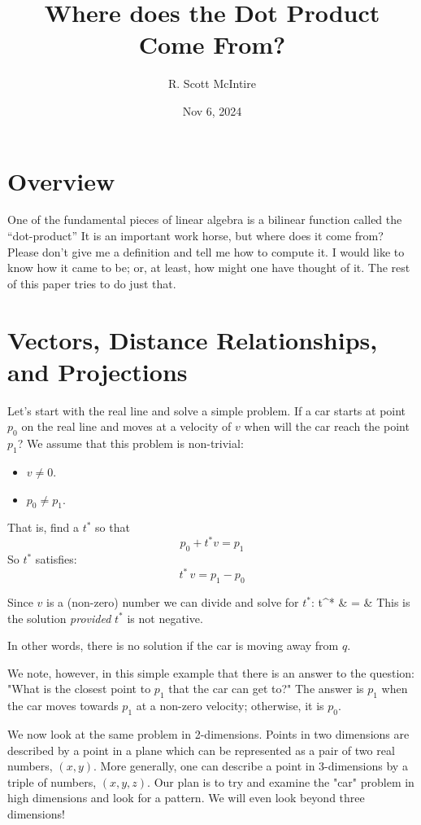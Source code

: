 \documentclass[12pt]{article}
\title{Where does the Dot Product Come From?}
\author{R. Scott McIntire}
\date{Nov 6, 2024}
\begin{document}
\maketitle

\section{Overview}
One of the fundamental pieces of linear algebra is a bilinear function
called the ``dot-product'' It is an important work horse, but where does
it come from? Please don't give me a definition and tell me how to compute it.
I would like to know how it came to be; or, at least, how might one
have thought of it. The rest of this paper tries to do just that.

\section{ Vectors, Distance Relationships, and Projections}
Let's start with the real line and solve a simple problem. 
If a car starts at 
point $p_0$ on the real line and moves at a velocity of $v$ when will the car 
reach the point $p_1$? We assume that this problem is non-trivial:
\begin{itemize}
	\item{$v \ne 0$.}
	\item{$p_0 \ne p_1$.}
\end{itemize}

That is, find a $t^*$ so that
$$ p_0 + t^* v = p_1$$
So $t^*$ satisfies:
$$ t^* \, v = p_1 - p_0$$

Since $v$ is a (non-zero) number we can divide and solve for 
$t^*$:%
\be
	t^* & = &  \label{closest_1}
\ee
This is the solution {\em provided\/} 
$t^*$ is not negative.

In other words, there is no solution if the car is 
moving away from $q$.

We note, however, in this simple example that there is an answer to the question:
"What is the closest point to $p_1$ that the car can get to?"
The answer is $p_1$ when the car moves towards $p_1$ at a non-zero velocity; otherwise,
it is $p_0$.

We now look at the same problem in 2-dimensions. Points in two dimensions 
are described by a point in a plane which can be represented as a pair of 
two real numbers, $(x, y)$. More generally, one can describe a point in 3-dimensions
by a triple of numbers, $(x, y, z)$. Our plan is to try and examine the "car"
problem in high dimensions and look for a pattern. We will even look beyond
three dimensions!
\end{document}
